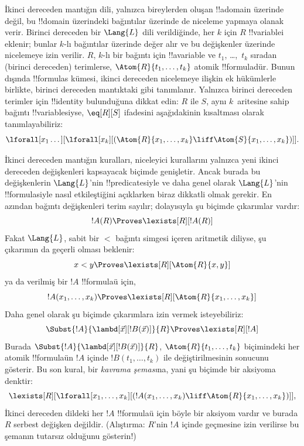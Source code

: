 \documentclass[../../../include/open-logic-section]{subfiles}
\begin{document}


İkinci dereceden mantığın dili, yalnızca bireylerden oluşan !!a{domain}
üzerinde değil, bu !!{domain} üzerindeki bağıntılar üzerinde de niceleme
yapmaya olanak verir. Birinci dereceden bir $\Lang{L}$ dili verildiğinde, her
$k$ için $R$ !!{variable}{}i eklenir; bunlar $k$-lı bağıntılar üzerinde değer
alır ve bu değişkenler üzerinde nicelemeye izin verilir. $R$, $k$-lı bir bağıntı için
!!a{variable} ve $t_1$, \dots,~$t_k$ sıradan (birinci dereceden) terimlerse,
$\Atom{R}{t_1,\dots,t_k}$ atomik !!{formula}{}dür. Bunun dışında !!{formula}s
kümesi, ikinci dereceden nicelemeye ilişkin ek hükümlerle birlikte, birinci
dereceden mantıktaki gibi tanımlanır. Yalnızca birinci dereceden terimler için
!!{identity} bulunduğuna dikkat edin: $R$ ile $S$, aynı $k$~aritesine sahip
bağıntı !!{variable}s{}iyse, $\eq[R][S]$ ifadesini aşağıdakinin kısaltması olarak
tanımlayabiliriz:
\[
\lforall[x_1 \dots][\lforall[x_k][(\Atom{R}{x_1, \dots, x_k} \liff
  \Atom{S}{x_1, \dots, x_k})]].
\]

İkinci dereceden mantığın kuralları, niceleyici kurallarını yalnızca yeni
ikinci dereceden değişkenleri kapsayacak biçimde genişletir. Ancak burada bu
değişkenlerin $\Lang{L}$'nin !!{predicate}s{}iyle ve daha genel olarak
$\Lang{L}$'nin !!{formula}s{}iyle nasıl etkileştiğini açıklarken biraz dikkatli
olmak gerekir. En azından bağıntı değişkenleri terim sayılır; dolayısıyla şu
biçimde çıkarımlar vardır:
\[
!A(R) \Proves \lexists[R][!A(R)]
\]
Fakat $\Lang{L}$, sabit bir $<$ bağıntı simgesi içeren aritmetik diliyse, şu
çıkarımın da geçerli olması beklenir:
\[
x < y \Proves \lexists[R][\Atom{R}{x,y}]
\]
ya da verilmiş bir $!A$ !!{formula}{}ü için,
\[
!A(x_1, \dots, x_k) \Proves \lexists[R][\Atom{R}{x_1,\dots,x_k}]
\]
Daha genel olarak şu biçimde çıkarımlara izin vermek isteyebiliriz:
\[
\Subst{!A}{\lambd[\vec x][!B(\vec x)]}{R} \Proves
\lexists[R][!A]
\]
Burada $\Subst{!A}{\lambd[\vec x][!B(\vec x)]}{R}$,
$\Atom{R}{t_1,\dots,t_k}$ biçimindeki her atomik !!{formula}{}ün $!A$ içinde
$!B(t_1, \dots, t_k)$ ile değiştirilmesinin sonucunu gösterir. Bu son kural,
bir {\em kavrama şeması}na, yani şu biçimde bir aksiyoma denktir:
\[
\lexists[R][\lforall[x_1, \dots, x_k][(!A(x_1, \dots, x_k) \liff
\Atom{R}{x_1, \dots, x_k})]],
\]
İkinci dereceden dildeki her $!A$ !!{formula}{}ü için böyle bir aksiyom vardır
ve burada $R$ serbest değişken değildir. (Alıştırma: $R$'nin $!A$ içinde
geçmesine izin verilirse bu şemanın tutarsız olduğunu gösterin!)
\end{document}
